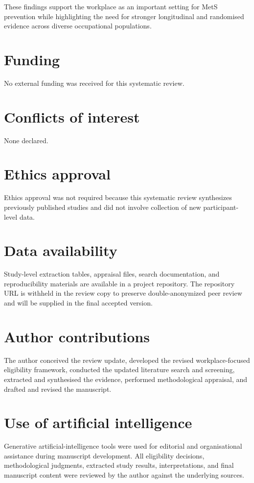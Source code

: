 \documentclass[11pt]{article}
\begin{document}
These findings support the workplace as an important setting for MetS prevention while highlighting the need for stronger longitudinal and randomised evidence across diverse occupational populations.

\section*{Funding}
No external funding was received for this systematic review.

\section*{Conflicts of interest}
None declared.

\section*{Ethics approval}
Ethics approval was not required because this systematic review synthesizes previously published studies and did not involve collection of new participant-level data.

\section*{Data availability}
Study-level extraction tables, appraisal files, search documentation, and reproducibility materials are available in a project repository. The repository URL is withheld in the review copy to preserve double-anonymized peer review and will be supplied in the final accepted version.

\section*{Author contributions}
The author conceived the review update, developed the revised workplace-focused eligibility framework, conducted the updated literature search and screening, extracted and synthesised the evidence, performed methodological appraisal, and drafted and revised the manuscript.

\section*{Use of artificial intelligence}
Generative artificial-intelligence tools were used for editorial and organisational assistance during manuscript development. All eligibility decisions, methodological judgments, extracted study results, interpretations, and final manuscript content were reviewed by the author against the underlying sources.



\end{document}

